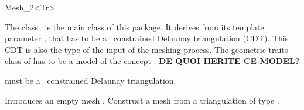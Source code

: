 \begin{ccRefClass}{Mesh_2<Tr>}

The class \ccRefName\ is the main class of this package. It derives
from its template parameter , that has to be a \cgal\
constrained Delaunay triangulation (CDT). This CDT is also the type of
the input of the meshing process. The geometric traits class of
 has to be a model of the concept . \textbf{DE QUOI
HERITE CE MODEL?}


\ccInheritsFrom


\ccRequirements

 must be a \cgal\ constrained Delaunay triangulation.

\ccTypes 
{}

\ccCreation
{}

{Introduces an empty mesh \ccVar.}
{Construct a mesh from a triangulation \ccc{t} of type \ccc{Tr}.}
{}

\end{ccRefClass}
